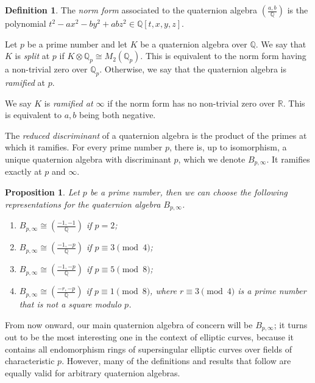 \documentclass[10pt]{article}
\theoremstyle{plain}
\newtheorem{proposition}[theorem]{Proposition}
\theoremstyle{definition}
\newtheorem{definition}[theorem]{Definition}
\def\Q{\ensuremath{\mathbb{Q}}}
\begin{document}
\begin{prposition}
\begin{definition}
The \emph{norm form} associated to the quaternion algebra $\left(\frac{a,b}{\Q}\right)$ is the polynomial $t^2 - ax^2 - by^2 + abz^2\in\Q[t,x,y,z]$. 
\end{definition}

Let $p$ be a prime number and let $K$ be a quaternion algebra over $\Q$.
We say that $K$ is \emph{split} at $p$ if $K\otimes\Q_p\cong M_2(\Q_p)$.
This is equivalent to the norm form having a non-trivial zero over $\Q_p$.
Otherwise, we say that the quaternion algebra is \emph{ramified} at $p$.

We say $K$ is \emph{ramified at $\infty$}
if the norm form has no non-trivial zero over $\mathbb{R}$.
This is equivalent to $a,b$ being both negative.

The \emph{reduced discriminant} of a quaternion algebra
is the product of the primes at which it ramifies.
For every prime number $p$, there is, up to isomorphism,
a unique quaternion algebra with discriminant $p$, which we denote
$B_{p,\infty}$. It ramifies exactly at $p$ and $\infty$.

\begin{proposition}
Let $p$ be a prime number, then we can choose the following representations
for the quaternion algebra $B_{p,\infty}$.
\begin{enumerate}
\item $B_{p,\infty} \cong \left(\frac{-1,-1}{\Q}\right)$
if $p=2$;
\item $B_{p,\infty} \cong \left(\frac{-1,-p}{\Q}\right)$
if $p\equiv 3\pmod{4}$;
\item $B_{p,\infty} \cong \left(\frac{-1,-p}{\Q}\right)$
if $p\equiv 5\pmod{8}$;
\item $B_{p,\infty} \cong \left(\frac{-r,-p}{\Q}\right)$
if $p\equiv 1\pmod{8}$, where $r\equiv 3\pmod{4}$ is a prime number
that is not a square modulo $p$.
\end{enumerate}
\end{proposition}

From now onward, our main quaternion algebra of concern will be $B_{p,\infty}$;
it turns out to be the most interesting one in the context of elliptic curves,
because it contains all endomorphism rings of supersingular elliptic curves
over fields of characteristic $p$. However, many of the definitions and results
that follow are equally valid for arbitrary quaternion algebras.



\end{prposition}
\end{document}

